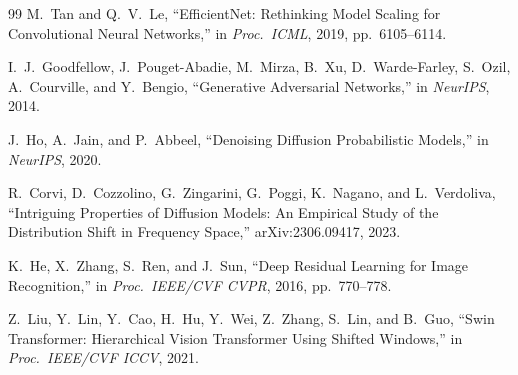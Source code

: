 \documentclass[12pt, a4paper]{article}
\begin{document}
\begin{thebibliography}{99}
M.~Tan and Q.~V.~Le,
``EfficientNet: Rethinking Model Scaling for Convolutional Neural Networks,''
in \textit{Proc.\ ICML}, 2019, pp.\ 6105--6114.

I.~J.~Goodfellow, J.~Pouget-Abadie, M.~Mirza, B.~Xu, D.~Warde-Farley,
S.~Ozil, A.~Courville, and Y.~Bengio,
``Generative Adversarial Networks,''
in \textit{NeurIPS}, 2014.

J.~Ho, A.~Jain, and P.~Abbeel,
``Denoising Diffusion Probabilistic Models,''
in \textit{NeurIPS}, 2020.

R.~Corvi, D.~Cozzolino, G.~Zingarini, G.~Poggi, K.~Nagano, and L.~Verdoliva,
``Intriguing Properties of Diffusion Models: An Empirical Study of the
Distribution Shift in Frequency Space,''
arXiv:2306.09417, 2023.

K.~He, X.~Zhang, S.~Ren, and J.~Sun,
``Deep Residual Learning for Image Recognition,''
in \textit{Proc.\ IEEE/CVF CVPR}, 2016, pp.\ 770--778.

Z.~Liu, Y.~Lin, Y.~Cao, H.~Hu, Y.~Wei, Z.~Zhang, S.~Lin, and B.~Guo,
``Swin Transformer: Hierarchical Vision Transformer Using Shifted Windows,''
in \textit{Proc.\ IEEE/CVF ICCV}, 2021.

\end{thebibliography}

\end{document}
